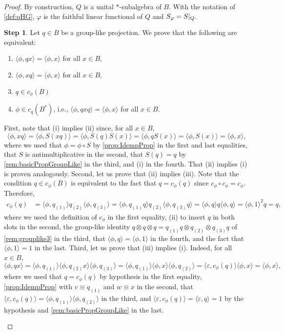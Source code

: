 \documentclass[a4paper,10pt]{amsart}
\newcommand{\eval}[2]{\langle #1 , #2\rangle}
\theoremstyle{definition}
\newtheorem{step-hypergroup}{Step}
\begin{document}
\begin{proof}
By construction, $Q$ is a unital $*$-subalgebra of $B$.
With the notation of \cref{def:qHG}, $\varphi$ is the faithful linear functional of $Q$ and $S_{\varphi} = S|_{\smash{Q}}$.
\begin{step-hypergroup}
Let $q\in B$ be a group-like projection. We prove that the following are equivalent:
\begin{enumerate}
    \item[(i)] $\eval{\phi}{qx} = \eval{\phi}{x}$ for all $x\in B$,
    \item[(ii)] $\eval{\phi}{xq} = \eval{\phi}{x}$ for all $x\in B$,
    \item[(iii)] $q\in c_\phi(B)$
    \item[(iv)] $\phi\in c_q(B^*)$, i.e., $\eval{\phi}{qxq} = \eval{\phi}{x}$ for all $x\in B$.
\end{enumerate}
First, note that (i) implies (ii) since, for all $x\in B$,
\[
    \eval{\phi}{xq}
    = \eval{\phi}{S(xq)}
    = \eval{\phi}{S(q)S(x)}
    = \eval{\phi}{qS(x)}
    = \eval{\phi}{S(x)} = \eval{\phi}{x},
\]
where we used that $\phi = \phi \circ S$ by \cref{prop:IdempProp} in the first and last equalities, that $S$ is antimultiplicative in the second, that $S(q) = q$ by \cref{rem:basicPropGroupLike} in the third, and (i) in the fourth. That (ii) implies (i) is proven analogously.
\smallbreak\noindent%
Second, let us prove that (ii) implies (iii). Note that the condition $q\in c_\phi(B)$ is equivalent to the fact that $q = c_\phi(q)$ since $c_\phi\circ c_\phi = c_\phi$. Therefore,
\begin{align*}
    c_\phi(q)
    &=
    \eval{\phi}{q_{(1)}} q_{(2)} \eval{\phi}{q_{(3)}}
    = 
    \eval{\phi}{q_{(1)}q} q_{(2)} \eval{\phi}{q_{(3)}q}
    = 
    \eval{\phi}{q} q \eval{\phi}{q}
    = 
    \eval{\phi}{1}^2 q = q,
\end{align*}
where we used the definition of $c_\phi$ in the first equality, (ii) to insert $q$ in both slots in the second, the group-like identity $q\otimes q\otimes q = q_{(1)}q\otimes q_{(2)}\otimes q_{(3)}q$ of \cref{rem:grouplike3} in the third, that $\eval{\phi}{q} = \eval{\phi}{1}$ in the fourth, and the fact that $\eval{\phi}{1}=1$ in the last.
\smallbreak\noindent%
Third, let us prove that (iii) implies (i). Indeed, for all $x\in B$,
\[
    \eval{\phi}{qx} 
    = \eval{\phi}{q_{(1)}}\eval{\phi}{q_{(2)}x} \eval{\phi}{q_{(3)}}
    = \eval{\phi}{q_{(1)}}\eval{\phi}{x} \eval{\phi}{q_{(2)}}
    = \eval{\varepsilon}{c_\phi(q)}\eval{\phi}{x}
    = \eval{\phi}{x},
\]
where we used that $q = c_\phi(q)$ by hypothesis in the first equality, \cref{prop:IdempProp} with $v\equiv q_{(1)}$ and $w\equiv x$ in the second, that $\eval{\varepsilon}{c_\phi(q)} = \eval{\phi}{q_{(1)}}\eval{\phi}{q_{(2)}}$ in the third, and $\eval{\varepsilon}{c_{\phi}(q)}=\eval{\varepsilon}{q}=1$ by the hypothesis and \cref{rem:basicPropGroupLike} in the last.

\end{step-hypergroup}
\end{proof}
\end{document}
